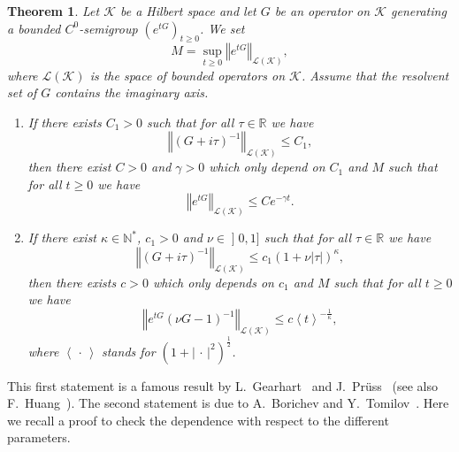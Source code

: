 \documentclass[11pt]{article}
\newtheorem{theo}{Theorem}[section]
\theoremstyle{definition}
\numberwithin{equation}{section}
\numberwithin{figure}{section}
\numberwithin{table}{section}
\newcommand{\abs}[1]{\left\vert #1\right\vert}
\newcommand{\nr}[1]{\left\Vert #1\right\Vert}
\newcommand{\pppg}[1] {\left< #1 \right>}
\renewcommand{\leq}{\leqslant}
\renewcommand{\geq}{\geqslant}
\newcommand{\inv}{^{-1}}
\newcommand{\1}{\mathds 1}
\newcommand{\R}{\mathbb{R}}
\newcommand{\N}{\mathbb{N}}
\renewcommand{\t}{\tau}
\newcommand{\Kc}{{\mathcal K}}
\newcommand{\Lc}{{\mathcal L}}
\begin{document}
\begin{theo}\label{th-GPH-BT}
Let $\Kc$ be a Hilbert space and let $G$ be an operator on $\Kc$ generating a bounded $C^0$-semigroup $(e^{tG})_{t \geq 0}$. We set
\[
M = \sup_{t \geq 0} \nr{e^{tG}}_{\Lc(\Kc)},
\]
where $\Lc(\Kc)$ is the space of bounded operators on $\Kc$. Assume that the resolvent set of $G$ contains the imaginary axis.
\begin{enumerate}%
\item If there exists $C_1 > 0$ such that for all $\t \in \R$ we have
\[
\nr{(G+i\t)\inv}_{\Lc(\Kc)} \leq C_1,
\]
then there exist $C > 0$ and $\gamma > 0$ which only depend on $C_1$ and $M$ such that for all $t \geq 0$ we have
\[
\nr{e^{tG}}_{\Lc(\Kc)} \leq C e^{-\gamma t}.
\]
\item If there exist $\kappa \in \N^*$, $c_1 > 0$ and $\nu \in\mathopen{]}0,1]$ such that for all $\t \in \R$ we have
\[
\nr{(G+i\t)\inv}_{\Lc(\Kc)} \leq c_1 (1+ \nu \abs \t)^{\kappa},
\]
then there exists $c > 0$ which only depends on $c_1$ and $M$ such that for all $t \geq 0$ we have
\[
\nr{e^{tG}(\nu G - 1)\inv}_{\Lc(\Kc)} \leq c \pppg t^{-\frac 1 \kappa},
\]
where $\pppg{\,\cdot\,}$ stands for $(1+\abs{\,\cdot\,}^2)^{\frac 12}$.
\end{enumerate}
\end{theo}

This first statement is a famous result by L.~Gearhart~\cite{Gearhart78} and J.~Pr\"uss~\cite{Pruss84} (see also F.~Huang~\cite{Huang85}). The second statement is due to A.~Borichev and Y.~Tomilov~\cite{BorichevTo10}. Here we recall a proof to check the dependence with respect to the different parameters.
\end{document}
